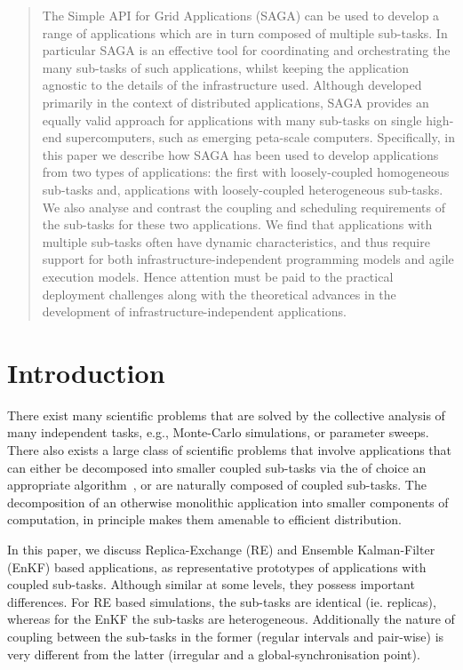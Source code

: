 \documentclass{llncs}
\begin{document}
\begin{abstract}
  The Simple API for Grid Applications (SAGA) can be used to develop a
  range of applications which are in turn composed of multiple
  sub-tasks.
  In particular SAGA is an effective tool for coordinating and
  orchestrating the many sub-tasks of such applications, whilst
  keeping the application agnostic to the details of the
  infrastructure used. Although developed primarily in the context of
  distributed applications, SAGA provides an equally valid approach
  for applications with many sub-tasks on single high-end
  supercomputers, such as emerging peta-scale computers.
  Specifically, in this paper we describe how SAGA has been used to
  develop applications from two types of applications: the first with
  loosely-coupled homogeneous sub-tasks and, applications with
  loosely-coupled heterogeneous sub-tasks. We also analyse and
  contrast the coupling and scheduling requirements of the sub-tasks
  for these two applications.  We find that applications with multiple
  sub-tasks often have dynamic characteristics, and thus require
  support for both infrastructure-independent programming models and
  agile execution models. Hence attention must be paid to the
  practical deployment challenges along with the theoretical advances
  in the development of infrastructure-independent applications.
\end{abstract}

\section{Introduction}
There exist many scientific problems that are solved by the collective
analysis of many independent tasks, e.g., Monte-Carlo simulations, or
parameter sweeps.  There also exists a large class of scientific
problems that involve applications that can either be decomposed into
smaller coupled sub-tasks via the of choice an appropriate
algorithm~\cite{spice_sc05}, or are naturally composed of coupled
sub-tasks. The decomposition of an otherwise monolithic application
into smaller components of computation, in principle makes them
amenable to efficient distribution. 

In this paper, we discuss Replica-Exchange (RE) and Ensemble
Kalman-Filter (EnKF) based applications, as representative prototypes
of applications with coupled sub-tasks.  Although similar at some
levels, they possess important differences.  For RE based
simulations, the sub-tasks are identical (ie. replicas), whereas for
the EnKF the sub-tasks are heterogeneous. Additionally the nature of
coupling between the sub-tasks in the former (regular intervals and
pair-wise) is very different from the latter (irregular and a
global-synchronisation point).
\end{document}
